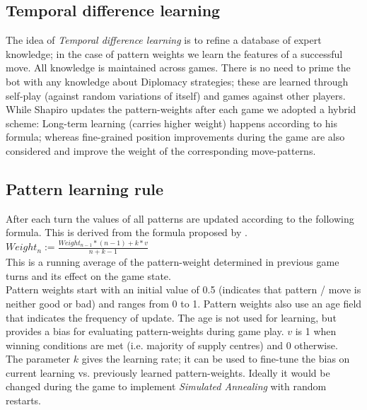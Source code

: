 \documentclass[pdftex,11pt,a4paper]{report}
\begin{document}
\subsection{Temporal difference learning}

The idea of \textit{Temporal difference learning} is to refine a
database of expert knowledge; in the case of pattern weights we learn
the features of a successful move. All knowledge is maintained across
games. There is no need to prime the bot with any knowledge about
Diplomacy strategies; these are learned through self-play (against
random variations of itself) and games against other players. While 
Shapiro \cite{Shapiro02} updates the pattern-weights after each game
we adopted a hybrid scheme: Long-term learning (carries higher weight) happens
according to his formula; whereas fine-grained position improvements during the
game are also considered and improve the weight of the corresponding move-patterns. \\

\subsection{Pattern learning rule}

After each turn the values of all patterns are updated
according to the following formula. This is derived from
the formula proposed by \cite{Shapiro02}. \\

$Weight_{n} := \frac{Weight_{n-1}*(n-1)+k*v}{n+k-1}$ \\

This is a running average of the pattern-weight determined
in previous game turns and its effect on the game state. \\

Pattern weights start with an initial value of 0.5 (indicates
that pattern / move is neither good or bad) and ranges from 0 to 1. 
Pattern weights also use an age field that indicates the frequency
of update. The age is not used for learning, but provides a bias
for evaluating pattern-weights during game play. $v$ is 1 when
winning conditions are met (i.e. majority of supply centres)
and 0 otherwise. \\

The parameter $k$ gives the learning rate; it can be used
to fine-tune the bias on current learning vs. previously
learned pattern-weights. Ideally it would be changed during
the game to implement \textit{Simulated Annealing} with
random restarts. \\
\end{document}
